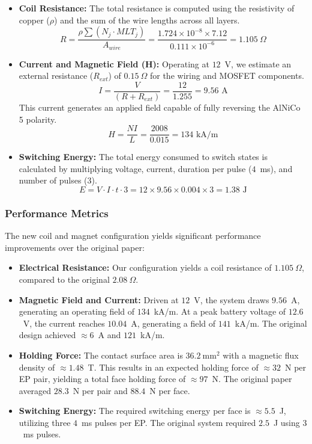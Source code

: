 \documentclass[12pt,a4paper]{article}
\begin{document}
\begin{itemize}
    \item \textbf{Coil Resistance:} The total resistance is computed using the resistivity of copper ($\rho$) and the sum of the wire lengths across all layers. $$R = \frac{\rho \sum (N_j \cdot MLT_j)}{A_{wire}} = \frac{1.724 \times 10^{-8} \times 7.12}{0.111 \times 10^{-6}} = 1.105~\Omega$$
    \item \textbf{Current and Magnetic Field (H):} Operating at $12$~V, we estimate an external resistance ($R_{ext}$) of $0.15~\Omega$ for the wiring and MOSFET components. $$I = \frac{V}{(R + R_{ext})} = \frac{12}{1.255} = 9.56 \text{ A}$$ This current generates an applied field capable of fully reversing the AlNiCo 5 polarity. $$H = \frac{NI}{L} = \frac{2008}{0.015} = 134 \text{ kA/m}$$
    \item \textbf{Switching Energy:} The total energy consumed to switch states is calculated by multiplying voltage, current, duration per pulse ($4$~ms), and number of pulses ($3$). $$E = V \cdot I \cdot t \cdot 3 = 12 \times 9.56 \times 0.004 \times 3 = 1.38 \text{ J}$$
\end{itemize}

\subsubsection{Performance Metrics}
The new coil and magnet configuration yields significant performance improvements over the original paper:
\begin{itemize}
    \item \textbf{Electrical Resistance:} Our configuration yields a coil resistance of $1.105~\Omega$, compared to the original $2.08~\Omega$.
    \item \textbf{Magnetic Field and Current:} Driven at $12$~V, the system draws $9.56$~A, generating an operating field of $134$~kA/m. At a peak battery voltage of $12.6$~V, the current reaches $10.04$~A, generating a field of $141$~kA/m. The original design achieved $\approx 6$~A and $121$~kA/m.
    \item \textbf{Holding Force:} The contact surface area is $36.2~\text{mm}^2$ with a magnetic flux density of $\approx 1.48$~T. This results in an expected holding force of $\approx 32$~N per EP pair, yielding a total face holding force of $\approx 97$~N. The original paper averaged $28.3$~N per pair and $88.4$~N per face.
    \item \textbf{Switching Energy:} The required switching energy per face is $\approx 5.5$~J, utilizing three $4$~ms pulses per EP. The original system required $2.5$~J using $3$~ms pulses.
\end{itemize}
\end{document}
